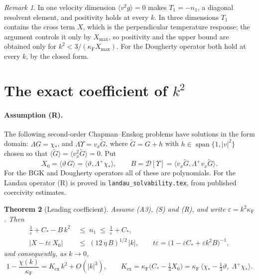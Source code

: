 \documentclass[11pt]{article}
\newcommand{\cD}{\mathcal{D}}
\newcommand{\avg}[1]{\langle #1\rangle}
\newtheorem{theorem}{Theorem}
\theoremstyle{remark}
\newtheorem{remark}[theorem]{Remark}
\begin{document}
\begin{remark}
In one velocity dimension $\avg{v^2g}=0$ makes $T_1=-n_1$, a diagonal
resolvent element, and positivity holds at every $k$. In three dimensions
$T_1$ contains the cross term $X$, which is the perpendicular temperature
response; the argument controls it only by $X_{\max}$, so positivity and the
upper bound are obtained only for $k^2<3/(\kappa_{\mathrm F}X_{\max})$. For
the Dougherty operator both hold at every $k$, by the closed form.
\end{remark}

\section{The exact coefficient of $k^2$}

\paragraph{Assumption (R).} The following second-order Chapman--Enskog
problems have solutions in the form domain: $\Lambda G=\chi_*$, and
$\Lambda\Upsilon=v_x\tilde G$, where $\tilde G=G+h$ with
$h\in\operatorname{span}\{1,|v|^2\}$ chosen so that
$\avg{\tilde G}=\avg{v_x^2\tilde G}=0$. Put
\begin{equation}
  X_0=\avg{\vartheta\,G}=\avg{\vartheta,\Lambda^+\chi_*},\qquad
  B=\cD[\Upsilon]=\avg{v_x\tilde G,\Lambda^+v_x\tilde G}.
\end{equation}
For the BGK and Dougherty operators all of these are polynomials. For the
Landau operator (R) is proved in \texttt{landau\_solvability.tex}, from
published coercivity estimates.

\begin{theorem}[Leading coefficient]\label{prop:K}
Assume (A3), (S) and (R), and write $\varepsilon=k^2\kappa_{\mathrm F}$.
Then
\begin{align}
  \frac1\varepsilon+C_*-B\,k^2\;&\le\;n_1\;\le\;\frac1\varepsilon+C_*,
  \label{eq:n1two}\\
  |X-t\varepsilon\,X_0|\;&\le\;(12\,\eta\,B)^{1/2}\,|k|,\qquad
  t\varepsilon=\bigl(1-\varepsilon C_*+\varepsilon k^2B\bigr)^{-1},
  \label{eq:Xclose}
\end{align}
and consequently, as $k\to0$,
\begin{equation}
  1-\frac{\chi(k)}{\kappa_{\mathrm F}}=K_{\mathrm{ex}}\,k^2+O(|k|^3),\qquad
  K_{\mathrm{ex}}=\kappa_{\mathrm F}\bigl(C_*-\tfrac13X_0\bigr)
  =\kappa_{\mathrm F}\,
  \bigl\langle\chi_*-\tfrac13\vartheta,\;\Lambda^+\chi_*\bigr\rangle .
\end{equation}
\end{theorem}
\end{document}
